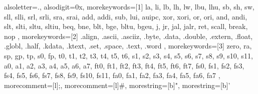 \usepackage{listings, chngcntr}
\renewcommand{\lstlistingname}{プログラム}
{
	alsoletter={.}, %
	alsodigit={0x}, %
	morekeywords=[1]{ %
			la, li, lb, lh, lw, lbu, lhu,
			sb, sh, sw,
			sll, slli, srl, srli, sra, srai,
			add, addi, sub, lui, auipc,
			xor, xori, or, ori, and, andi,
			slt, slti, sltu, sltiu,
			beq, bne, blt, bge, bltu, bgeu,
			j, jr, jal, jalr, ret,
			scall, break, nop
		},
	morekeywords=[2]{ %
			.align, .ascii, .asciiz, .byte, .data, .double, .extern,
			.float, .globl, .half, .kdata, .ktext, .set, .space, .text, .word
		},
	morekeywords=[3]{ %
			zero, ra, sp, gp, tp, s0, fp,
			t0, t1, t2, t3, t4, t5, t6,
			s1, s2, s3, s4, s5, s6, s7, s8, s9, s10, s11,
			a0, a1, a2, a3, a4, a5, a6, a7,
			ft0, ft1, ft2, ft3, ft4, ft5, ft6, ft7,
			fs0, fs1, fs2, fs3, fs4, fs5, fs6, fs7, fs8, fs9, fs10, fs11,
			fa0, fa1, fa2, fa3, fa4, fa5, fa6, fa7
		},
	morecomment=[l]{;},   %
	morecomment=[l]{\#},  %
	morestring=[b]",      %
	morestring=[b]'       %
}

